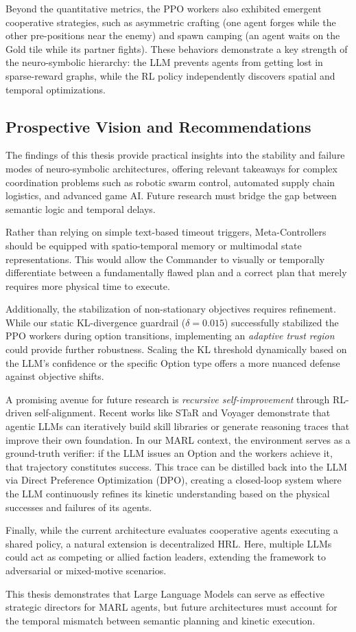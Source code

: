 Beyond the quantitative metrics, the PPO workers also exhibited emergent cooperative strategies, such as asymmetric crafting (one agent forges while the other pre-positions near the enemy) and spawn camping (an agent waits on the Gold tile while its partner fights). These behaviors demonstrate a key strength of the neuro-symbolic hierarchy: the LLM prevents agents from getting lost in sparse-reward graphs, while the RL policy independently discovers spatial and temporal optimizations.

\subsection{Prospective Vision and Recommendations}
\label{sec:prospective_vision}

The findings of this thesis provide practical insights into the stability and failure modes of neuro-symbolic architectures, offering relevant takeaways for complex coordination problems such as robotic swarm control, automated supply chain logistics, and advanced game AI. Future research must bridge the gap between semantic logic and temporal delays. 

Rather than relying on simple text-based timeout triggers, Meta-Controllers should be equipped with spatio-temporal memory or multimodal state representations. This would allow the Commander to visually or temporally differentiate between a fundamentally flawed plan and a correct plan that merely requires more physical time to execute.

Additionally, the stabilization of non-stationary objectives requires refinement. While our static KL-divergence guardrail ($\delta=0.015$) successfully stabilized the PPO workers during option transitions, implementing an \emph{adaptive trust region} could provide further robustness. Scaling the KL threshold dynamically based on the LLM's confidence or the specific Option type offers a more nuanced defense against objective shifts.

A promising avenue for future research is \emph{recursive self-improvement} through RL-driven self-alignment. Recent works like STaR \parencite{zelikman2022star} and Voyager \parencite{wang2023voyager} demonstrate that agentic LLMs can iteratively build skill libraries or generate reasoning traces that improve their own foundation. In our MARL context, the environment serves as a ground-truth verifier: if the LLM issues an Option and the workers achieve it, that trajectory constitutes success. This trace can be distilled back into the LLM via Direct Preference Optimization (DPO), creating a closed-loop system where the LLM continuously refines its kinetic understanding based on the physical successes and failures of its agents.

Finally, while the current architecture evaluates cooperative agents executing a shared policy, a natural extension is decentralized HRL. Here, multiple LLMs could act as competing or allied faction leaders, extending the framework to adversarial or mixed-motive scenarios.

This thesis demonstrates that Large Language Models can serve as effective strategic directors for MARL agents, but future architectures must account for the temporal mismatch between semantic planning and kinetic execution.